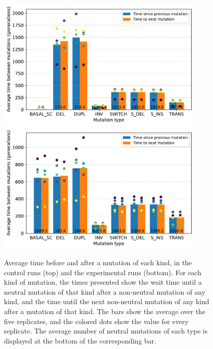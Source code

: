 \begin{figure}
\centering
\includegraphics[width=0.9\textwidth]{aevol/images/epistasis_control.pdf}
\includegraphics[width=0.9\textwidth]{aevol/images/epistasis_sc.pdf}
\caption[Measuring epistasis with the average times before and after mutations]{Average time before and after a mutation of each kind, in the control runs (top) and the experimental runs (bottom).
For each kind of mutation, the times presented show the wait time until a neutral mutation of that kind after a non-neutral mutation of any kind, and the time until the next non-neutral mutation of any kind after a mutation of that kind.
The bars show the average over the five replicates, and the colored dots show the value for every replicate.
The average number of neutral mutations of each type is displayed at the bottom of the corresponding bar.}
\label{fig:aevol:epistasis}
\end{figure}

